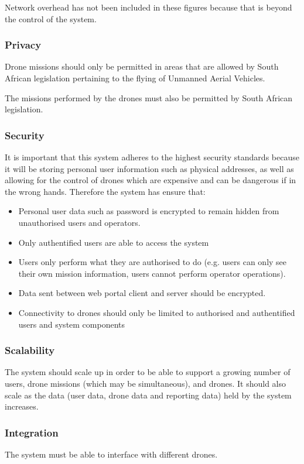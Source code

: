 \documentclass{article}
\begin{document}
			Network overhead has not been included in these figures because that is beyond the control of the system.
			
			\subsubsection{Privacy}
			Drone missions should only be permitted in areas that are allowed by South African legislation pertaining to the flying of Unmanned Aerial Vehicles.
			
			The missions performed by the drones must also be permitted by South African legislation.
			
			\subsubsection{Security}
			It is important that this system adheres to the highest security standards because it will be storing personal user information such as physical addresses, as well as allowing for the control of drones which are expensive and can be dangerous if in the wrong hands. Therefore the system has ensure that:
			\begin{itemize}
				\item Personal user data such as password is encrypted to remain hidden from unauthorised users and operators.
				\item Only authentified users are able to access the system
				\item Users only perform what they are authorised to do (e.g. users can only see their own mission information, users cannot perform operator operations).
				\item Data sent between web portal client and server should be encrypted.
				\item Connectivity to drones should only be limited to authorised and authentified users and system components
			\end{itemize}
			
			\subsubsection{Scalability}
			The system should scale up in order to be able to support a growing number of users, drone missions (which may be simultaneous), and drones. It should also scale as the data (user data, drone data and reporting data) held by the system increases.
			
			\subsubsection{Integration}
			The system must be able to interface with different drones.
\end{document}
